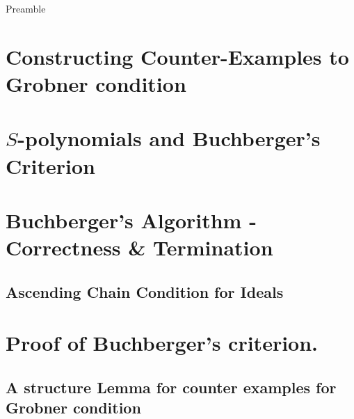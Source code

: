 \noindent
Preamble

\section{Constructing Counter-Examples to Grobner condition}

\section{$S$-polynomials and Buchberger's Criterion}

\section{Buchberger's Algorithm - Correctness \& Termination}
\subsection{Ascending Chain Condition for Ideals}

\section{Proof of Buchberger's criterion.}
\subsection{A structure Lemma for counter examples for Grobner condition}